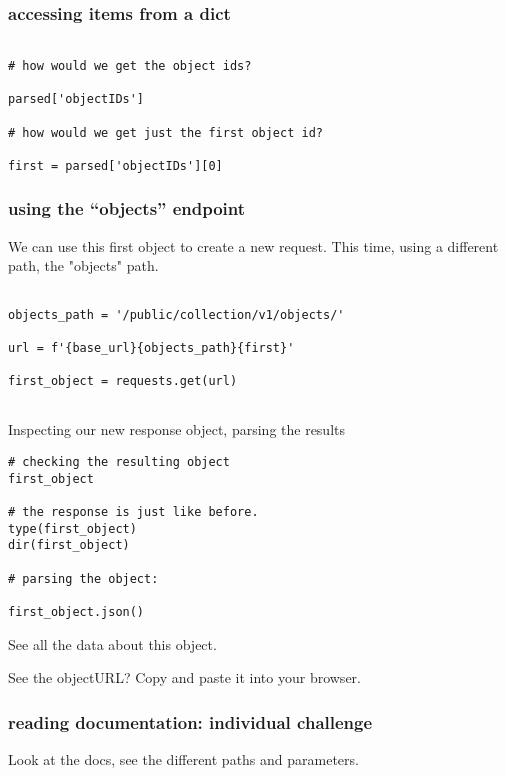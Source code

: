 \documentclass[11pt]{article}
\begin{document}
\subsubsection{accessing items from a dict}
\label{sec:org0451d6c}

\begin{verbatim}

# how would we get the object ids?

parsed['objectIDs']

# how would we get just the first object id?

first = parsed['objectIDs'][0]

\end{verbatim}

\subsubsection{using the “objects” endpoint}
\label{sec:org5f5ef50}

We can use this first object to create a new request. This time, using
a different path, the "objects" path.

\begin{verbatim}

objects_path = '/public/collection/v1/objects/'

url = f'{base_url}{objects_path}{first}'

first_object = requests.get(url)


\end{verbatim}

Inspecting our new response object, parsing the results

\begin{verbatim}
# checking the resulting object
first_object

# the response is just like before. 
type(first_object)
dir(first_object)

# parsing the object:

first_object.json()
\end{verbatim}

See all the data about this object.

See the objectURL? Copy and paste it into your browser.

\subsubsection{reading documentation: individual challenge}
\label{sec:org7fa3185}
Look at the docs, see the different paths and parameters.
\end{document}
